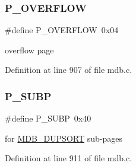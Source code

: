 \subsubsection{\texorpdfstring{P\+\_\+\+O\+V\+E\+R\+F\+L\+OW}{P\_OVERFLOW}}
{\footnotesize\ttfamily \#define P\+\_\+\+O\+V\+E\+R\+F\+L\+OW~0x04}

overflow page 

Definition at line 907 of file mdb.\+c.

\mbox{\label{group__mdb__page_ga77cc6dc98fda40c81fb2f75068fb5551}} 
\subsubsection{\texorpdfstring{P\+\_\+\+S\+U\+BP}{P\_SUBP}}
{\footnotesize\ttfamily \#define P\+\_\+\+S\+U\+BP~0x40}

for \mbox{\hyperlink{group__mdb__dbi__open_gae0626566c2562e9007f5c8c9535bab1a}{M\+D\+B\+\_\+\+D\+U\+P\+S\+O\+RT}} sub-\/pages 

Definition at line 911 of file mdb.\+c.

